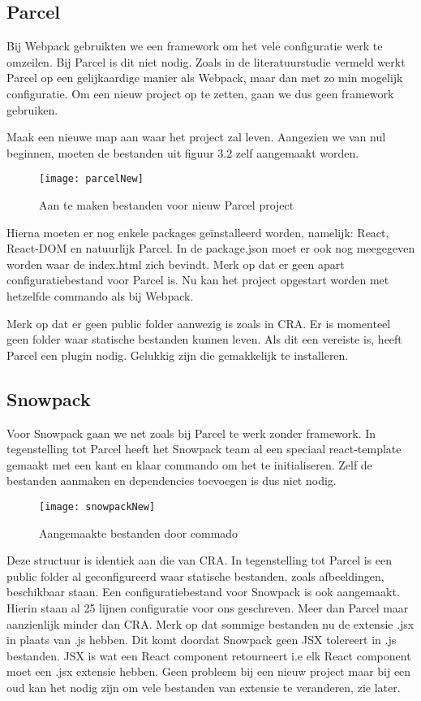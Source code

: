 \subsection{Parcel}
Bij Webpack gebruikten we een framework om het vele configuratie werk te omzeilen. Bij Parcel is dit niet nodig. Zoals in de literatuurstudie vermeld werkt Parcel op een gelijkaardige manier als Webpack, maar dan met zo min mogelijk configuratie. Om een nieuw project op te zetten, gaan we dus geen framework gebruiken.

Maak een nieuwe map aan waar het project zal leven. Aangezien we van nul beginnen, moeten de bestanden uit figuur 3.2 zelf aangemaakt worden.

\begin{figure}[h]
    \texttt{[image: parcelNew]}
        \centering
        \caption{Aan te maken bestanden voor nieuw Parcel project}
    \end{figure}

    Hierna moeten er nog enkele packages geïnstalleerd worden, namelijk: React, React-DOM en natuurlijk Parcel. In de package.json moet er ook nog meegegeven worden waar de index.html zich bevindt. Merk op dat er geen apart configuratiebestand voor Parcel is. Nu kan het project opgestart worden met hetzelfde commando als bij Webpack.

    Merk op dat er geen public folder aanwezig is zoals in CRA. Er is momenteel geen folder waar statische bestanden kunnen leven. Als dit een vereiste is, heeft Parcel een plugin nodig. Gelukkig zijn die gemakkelijk te installeren.

\subsection{Snowpack}
Voor Snowpack gaan we net zoals bij Parcel te werk zonder framework. In tegenstelling tot Parcel heeft het Snowpack team al een speciaal react-template gemaakt met een kant en klaar commando om het te initialiseren. Zelf de bestanden aanmaken en dependencies toevoegen is dus niet nodig.


\begin{figure}[h]
    \texttt{[image: snowpackNew]}
        \centering
        \caption[Aangemaakte bestanden door Snowpack commando]{Aangemaakte bestanden door commado}
    \end{figure}

Deze structuur is identiek aan die van CRA. In tegenstelling tot Parcel is een public folder al geconfigureerd waar statische bestanden, zoals afbeeldingen, beschikbaar staan. Een configuratiebestand voor Snowpack is ook aangemaakt. Hierin staan al 25 lijnen configuratie voor ons geschreven. Meer dan Parcel maar aanzienlijk minder dan CRA. Merk op dat sommige bestanden nu de extensie .jsx in plaats van .js hebben. Dit komt doordat Snowpack geen JSX tolereert in .js bestanden. JSX is wat een React component retourneert i.e elk React component moet een .jsx extensie hebben. Geen probleem bij een nieuw project maar bij een oud kan het nodig zijn om vele bestanden van extensie te veranderen, zie later.

